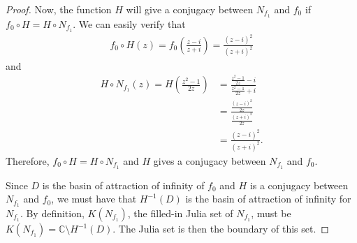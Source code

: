 \begin{proof}
  Now, the function $H$ will give a conjugacy between $N_{f_1}$ and $f_0$ if $f_0 \circ H = H \circ N_{f_1}$.
  We can easily verify that
  \begin{align*}
    f_0 \circ H (z) = f_0\left(\frac{z-i}{z+i}\right) = \frac{(z-i)^2}{(z+i)^2}
  \end{align*}
  and
  \begin{align*}
    H \circ N_{f_1}(z) = H\left(\frac{z^2-1}{2z}\right) &= \frac{\frac{z^2-1}{2z} - i}{\frac{z^2-1}{2z}+i} \\
    &= \frac{\frac{(z-i)^2}{2z}}{\frac{(z+i)^2}{2z}} \\
    &= \frac{(z-i)^2}{(z+i)^2}.
  \end{align*}
  Therefore, $f_0 \circ H = H \circ N_{f_1}$ and $H$ gives a conjugacy between $N_{f_1}$ and $f_0$.

  Since $D$ is the basin of attraction of infinity of $f_0$ and $H$ is a conjugacy between $N_{f_1}$ and $f_0$,
  we must have that $H^{-1}(D)$ is the basin of attraction of infinity for $N_{f_1}$. By definition, $K(N_{f_1})$,
  the filled-in Julia set of $N_{f_1}$, must be $K(N_{f_1}) = \mathbb{C} \setminus H^{-1}(D)$. The Julia set is then the
  boundary of this set.

\end{proof}
\newpage
